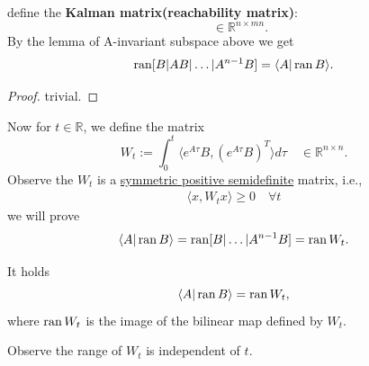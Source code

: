 \begin{corollary}
	define the \textbf{Kalman matrix(reachability matrix)}:
\begin{equation*}
	[B|AB|A^2B|\dots| A^{n -1}B] \quad \in \mathbb{R}^{n \times mn} .
\end{equation*}	
By the lemma of A-invariant subspace above we get 
\begin{align*}
	\operatorname{ran} [B|AB|\dots|A^{n -1}B] = \langle A| \operatorname{ran} B\rangle. 
\end{align*}
\end{corollary}
\begin{proof}
	trivial.
\end{proof}

Now for $t \in \mathbb{R}$, we define the matrix
\begin{equation}
		W_t := \int_0^t \langle  e^{A\tau} B, (e^{A\tau} B)^T\rangle d\tau \quad \in \mathbb{R}^{n \times n}.
\end{equation}
Observe the $W_t$ is a \underline{symmetric positive semidefinite} matrix, i.e., 
\begin{align*}
	\langle x, W_t x \rangle \ge 0 \quad \forall t 
\end{align*}  we will prove 
\begin{align*}
	\langle A|\operatorname{ran} B \rangle = \operatorname{ran} [B|\dots|A^{n -1}B] = \operatorname{ran} W_t.
\end{align*}


\begin{lemma}
It holds
\begin{equation}
	\langle A| \operatorname{ran} B \rangle = \operatorname{ran}  W_t, 
\end{equation}	
where $\operatorname{ran} W_t$ is the image of the bilinear map defined by $W_t$. 
\end{lemma}
\begin{remark}
Observe the range of $W_t$ is independent of $t$. 	
\end{remark}

